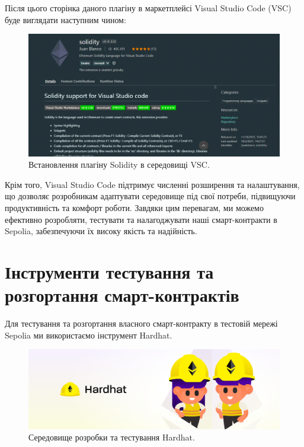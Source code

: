     Після цього сторінка даного плагіну в маркетплейсі Visual Studio Code (VSC) буде виглядати наступним чином:

    \begin{figure}[ht]
        \centering
        \includegraphics[scale=0.45]{IMAGES/solidity-extension-vsc1.png}
        \caption{Встановлення плагіну Solidity в середовищі VSC.}
        \label{fig_vsc}
    \end{figure}

Крім того, Visual Studio Code підтримує численні розширення та налаштування, що дозволяє розробникам адаптувати середовище під свої потреби, підвищуючи продуктивність та комфорт роботи. Завдяки цим перевагам, ми можемо ефективно розробляти, тестувати та налагоджувати наші смарт-контракти в Sepolia, забезпечуючи їх високу якість та надійність.

\section{Інструменти тестування та розгортання смарт-контрактів}

Для тестування та розгортання власного смарт-контракту в тестовій мережі Sepolia ми використаємо інструмент Hardhat. 

    \begin{figure}[ht]
        \centering
        \includegraphics[scale=0.2]{IMAGES/hardhat-logo.png}
        \caption{Середовище розробки та тестування Hardhat.}
        \label{fig_vsc}
    \end{figure}

